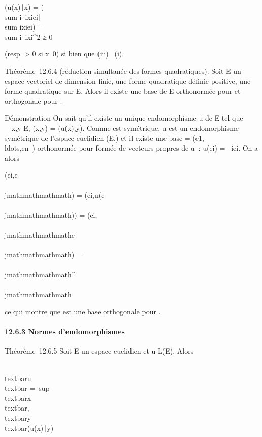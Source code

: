 (u(x)∣x) = (\\sum
i\lambda~ixiei∣\\sum
ixiei) = \\sum
i\lambda~ixi^2 ≥ 0

(resp. \textgreater{} 0 si x\neq~0) si bien que
(iii) \rigtharrow~(i).

Théorème~12.6.4 (réduction simultanée des formes quadratiques). Soit E
un ~ espace vectoriel de dimension finie, \Phi une forme quadratique
définie positive, \Psi une forme quadratique sur E. Alors il existe une
base  de E orthonormée pour \Phi et orthogonale pour \Psi.

Démonstration On sait qu'il existe un unique endomorphisme u de E tel
que \forall~~x,y \in E, \psi(x,y) = \phi(u(x),y). Comme \psi est
symétrique, u est un endomorphisme symétrique de l'espace euclidien
(E,\Phi) et il existe une base  =
(e1,\\ldots,en~)
orthonormée pour \Phi formée de vecteurs propres de u~: u(ei) =
\lambda~iei. On a alors

\psi(ei,e\\\\jmathmathmathmath) = \phi(ei,u(e\\\\jmathmathmathmath)) =
\phi(ei,\lambda~\\\\jmathmathmathmathe\\\\jmathmathmathmath) =
\lambda~\\\\jmathmathmathmath\deltai^\\\\jmathmathmathmath

ce qui montre que  est une base orthogonale pour \psi.

\paragraph{12.6.3 Normes d'endomorphismes}

Théorème~12.6.5 Soit E un espace euclidien et u \in L(E). Alors

\\textbar{}u\\textbar{}
=\
sup\\textbar{}x\\textbar{},\\textbar{}y\\textbar{}\textbar{}(u(x)∣y)\textbar{}

